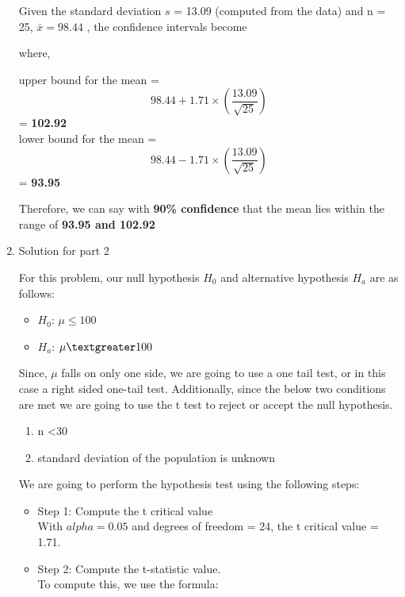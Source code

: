 \documentclass[12pt,letterpaper]{article}
\begin{document}
\begin{enumerate}
    Given the standard deviation $s$ = 13.09 (computed from the data) and n = 25, $\bar{x} = 98.44$ , the confidence intervals become

    where, 

    upper bound for the mean = 
    \[ 98.44 + 1.71 \times \left(\frac{13.09}{\sqrt{25}}\right) \] = \textbf{102.92} \\
    lower bound for the mean = 
    \[ 98.44 - 1.71 \times \left(\frac{13.09}{\sqrt{25}}\right) \] = \textbf{93.95}

  Therefore, we can say with \textbf{90\% confidence} that the mean lies within the range of \textbf{93.95 and 102.92}
\vspace{3mm}
\item Solution for part 2

\vspace{3mm}

For this problem, our null hypothesis $H_0$ and alternative hypothesis $H_a$ are as follows:

\begin{itemize}
    \item $H_0$: $\mu \leq 100$
    \item $H_a$: $\mu \textgreater 100$
\end{itemize}

Since, $\mu$ falls on only one side, we are going to use a one tail test, or in this case a right sided one-tail test. Additionally, since the below two conditions are met we are going to use the t test to reject or accept the null hypothesis. 

       \begin{enumerate}
          \item n \textless 30
          \item standard deviation of the population is unknown
        \end{enumerate}


We are going to perform the hypothesis test using the following steps:

\begin{itemize}
    \item Step 1: Compute the t critical value \\
    With $alpha = 0.05$ and degrees of freedom = 24, the t critical value = 1.71. 
    
    \item Step 2: Compute the t-statistic value. \\ 
  
    To compute this, we use the formula: 


\end{itemize}
\end{enumerate}
\end{document}
